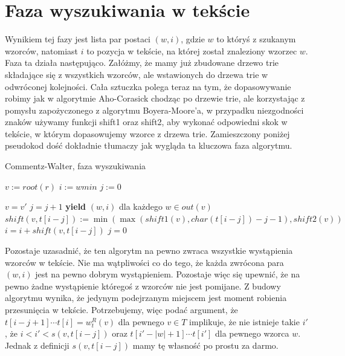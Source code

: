 \documentclass[a4paper,11pt]{article}
\begin{document}
\section{Faza wyszukiwania w tekście}
Wynikiem tej fazy jest lista par postaci $(w, i)$, gdzie $w$ to któryś z szukanym wzorców, natomiast $i$ to pozycja w tekście, na której został znaleziony wzorzec $w$. Faza ta działa następująco. Załóżmy, że mamy już zbudowane drzewo trie składające się z wszystkich wzorców, ale wstawionych do drzewa trie w odwróconej kolejności. Cała sztuczka polega teraz na tym, że dopasowywanie robimy jak w algorytmie Aho-Corasick chodząc po drzewie trie, ale korzystając z pomysłu zapożyczonego z algorytmu Boyera-Moore'a, w przypadku niezgodności znaków używamy funkcji shift1 oraz shift2, aby wykonać odpowiedni skok w tekście, w którym dopasowujemy wzorce z drzewa trie. Zamieszczony poniżej pseudokod dość dokładnie tłumaczy jak wygląda ta kluczowa faza algorytmu.

\begin{algorithm}
\caption{Commentz-Walter, faza wyszukiwania}\label{euclid}
\begin{algorithmic}[1]
 
\State $v := root(r)$ 
\State $i := wmin$ 
\State $j := 0$ 

     
        \State $v = v'$
        \State $j = j + 1$
        \State \textbf{yield} $(w, i)$ dla każdego $w \in out(v)$
    \EndWhile
\State $shift(v, t[i-j]) := \min(\max(shift1(v), char(t[i-j])-j-1), shift2(v))$
\State $i = i + shift(v, t[i-j])$ 
\State $j = 0$
\EndWhile
\EndProcedure
\end{algorithmic}
\end{algorithm}

Pozostaje uzasadnić, że ten algorytm na pewno zwraca wszystkie wystąpienia wzorców w tekście. Nie ma wątpliwości co do tego, że każda zwrócona para $(w, i)$ jest na pewno dobrym wystąpieniem. Pozostaje więc się upewnić, że na pewno żadne wystąpienie któregoś z wzorców nie jest pomijane. Z budowy algorytmu wynika, że jedynym podejrzanym miejscem jest moment robienia przesunięcia w tekście. Potrzebujemy, więc podać argument, że $t[i-j+1]\cdots t[i] = w_t^R(v)$ dla pewnego $v \in T$ implikuje, że nie istnieje takie $i'$, że $i < i' < s(v, t[i-j])$ oraz $t[i'-|w|+1]\cdots t[i']$ dla pewnego wzorca $w$. Jednak z definicji $s(v, t[i-j])$ mamy tę własność po prostu za darmo.
\end{document}
